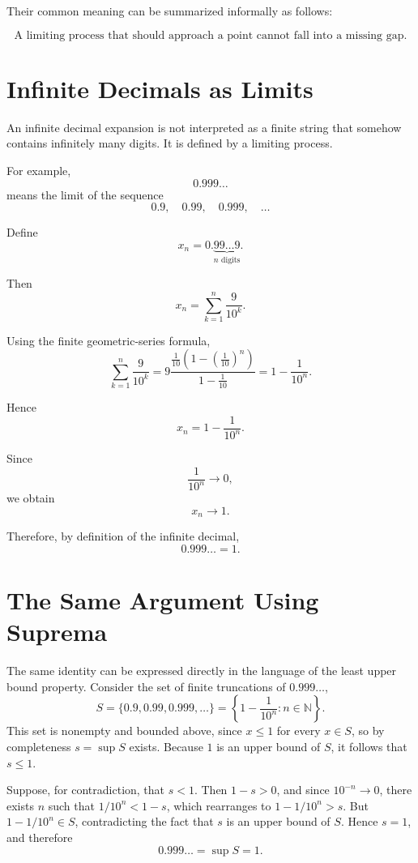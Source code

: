 \documentclass{essay}
\begin{document}
Their common meaning can be summarized informally as follows:

\[ \boxed{ \text{A limiting process that should approach a point cannot fall into a missing gap.} } \]

\section{Infinite Decimals as Limits}

An infinite decimal expansion is not interpreted as a finite string that somehow contains infinitely many digits. It is defined by a limiting process.

For example,
\[ 0.999\ldots \]
means the limit of the sequence
\[ 0.9,\quad 0.99,\quad 0.999,\quad \ldots \]

Define
\[ x_{n} = 0.\underbrace{99\ldots9}_{n\text{ digits}}. \]

Then
\[ x_{n} = \sum_{k=1}^{n}\frac{9}{10^{k}}. \]

Using the finite geometric-series formula,
\[ \sum_{k=1}^{n}\frac{9}{10^{k}} = 9\frac{\frac{1}{10}\left(1-\left(\frac{1}{10}\right)^{n}\right)}{1-\frac{1}{10}} = 1-\frac{1}{10^{n}}. \]

Hence
\[ x_{n}=1-\frac{1}{10^{n}}. \]

Since
\[ \frac{1}{10^{n}}\to0, \]
we obtain
\[ x_{n}\to1. \]

Therefore, by definition of the infinite decimal,
\[ \boxed{0.999\ldots=1}. \]

\section{The Same Argument Using Suprema}

The same identity can be expressed directly in the language of the least upper bound property. Consider the set of finite truncations of \(0.999\ldots\),
\[ S=\{0.9,0.99,0.999,\ldots\}=\left\{1-\frac{1}{10^{n}}:n\in\mathbb{N}\right\}. \]
This set is nonempty and bounded above, since \(x\leq1\) for every \(x\in S\), so by completeness \(s=\sup S\) exists. Because \(1\) is an upper bound of \(S\), it follows that \(s\leq1\).

Suppose, for contradiction, that \(s<1\). Then \(1-s>0\), and since \(10^{-n}\to0\), there exists \(n\) such that \(1/10^{n}<1-s\), which rearranges to \(1-1/10^{n}>s\). But \(1-1/10^{n}\in S\), contradicting the fact that \(s\) is an upper bound of \(S\). Hence \(s=1\), and therefore
\[ 0.999\ldots = \sup S = 1. \]
\end{document}
